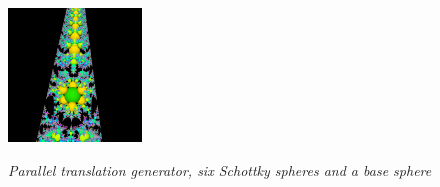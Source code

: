 \begin{figure}[h!tbp]
\begin{minipage}[t]{0.5\hsize}
  \hspace*{\fill}
 \begin{minipage}{0.25\hsize}
  \center
  \includegraphics[width=1.4in, height=1.4in, keepaspectratio]{./img/application/3dGen/translationOrbit.pdf}
    \label{fig:translation3dOrb}
 \end{minipage}
  \hspace*{\fill}
  \caption{\textit{Parallel translation generator, six Schottky spheres
  and a base sphere}}
  \label{fig:translation3d}
 \end{minipage}
\end{figure}

